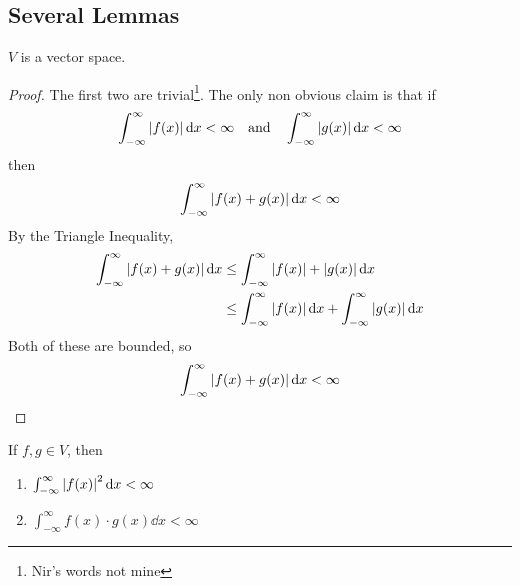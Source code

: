 \subsection{Several Lemmas}
\begin{lemma}
    $V$ is a vector space.
\end{lemma}
\begin{proof}
    The first two are trivial\footnote{Nir's words not mine}. The only non obvious claim is that if
    \begin{align}
        \int_{-\infty}^\infty \abs{f(x)} \dd{x} < \infty \qand \int_{-\infty}^\infty \abs{g(x)} \dd{x} < \infty
    \end{align}
    then
    \begin{align}
        \int_{-\infty}^\infty \abs{f(x) + g(x)} \dd{x} < \infty
    \end{align}
    By the Triangle Inequality,
    \begin{align}
        \int_{-\infty}^\infty \abs{f(x) + g(x)} \dd{x} &\le \int_{-\infty}^\infty \abs{f(x)} + \abs{g(x)} \dd{x}\\
        &\le \int_{-\infty}^\infty \abs{f(x)} \dd{x} + \int_{-\infty}^\infty \abs{g(x)} \dd{x}
    \end{align}
    Both of these are bounded, so
    \begin{align}
        \int_{-\infty}^\infty \abs{f(x) + g(x)} \dd{x} < \infty
    \end{align}
\end{proof}
\begin{lemma}
    If $f, g \in V$, then
    \begin{enumerate}
        \item $\int_{-\infty}^\infty \abs{f(x)}^2 \dd{x} < \infty$
        \item $\int_{-\infty}^\infty f(x)\cdot g(x) \dd{x} < \infty$
    \end{enumerate}
\end{lemma}
